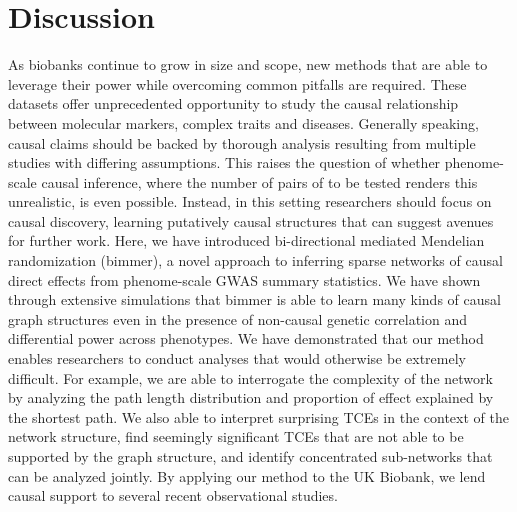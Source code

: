 \documentclass{article}
\begin{document}
\section{Discussion}\label{discussion}
As biobanks continue to grow in size and scope, new methods that are able to
leverage their power while overcoming common pitfalls are required.
These datasets offer unprecedented opportunity to study
the causal relationship between molecular markers, complex traits and diseases.
Generally speaking, causal claims should be backed by thorough analysis resulting from
multiple studies with differing assumptions. This raises the question
of whether phenome-scale causal inference, where the number of pairs of to be tested
renders this unrealistic, is even possible. Instead, in this setting researchers should focus on
causal discovery, learning putatively causal structures that can suggest avenues for further
work.
Here, we have introduced bi-directional mediated Mendelian randomization (bimmer),
a novel approach to inferring sparse networks of causal direct effects from phenome-scale
GWAS summary statistics. We have shown through extensive simulations that
bimmer is able to learn many kinds of causal graph structures even in the presence
of non-causal genetic correlation and differential power across phenotypes.
We have demonstrated that our method enables researchers to conduct 
analyses that would otherwise be extremely difficult. For example, 
we are able to interrogate the complexity of the network by analyzing the path length
distribution and proportion of effect explained by the shortest path. We also able to 
interpret surprising TCEs in the context of the network structure, find seemingly
significant TCEs that are not able to be supported by the graph  structure, and
identify concentrated sub-networks that can be analyzed jointly. By applying our
method to the UK Biobank, we lend causal support to several recent observational studies.
\end{document}
